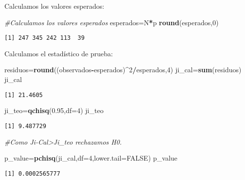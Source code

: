 \documentclass[a4paper,oneside,openany]{book}
\newenvironment{Shaded}{\begin{snugshade}}{\end{snugshade}}
\newcommand{\KeywordTok}[1]{\textcolor[rgb]{0.13,0.29,0.53}{\textbf{#1}}}
\newcommand{\DataTypeTok}[1]{\textcolor[rgb]{0.13,0.29,0.53}{#1}}
\newcommand{\DecValTok}[1]{\textcolor[rgb]{0.00,0.00,0.81}{#1}}
\newcommand{\FloatTok}[1]{\textcolor[rgb]{0.00,0.00,0.81}{#1}}
\newcommand{\CommentTok}[1]{\textcolor[rgb]{0.56,0.35,0.01}{\textit{#1}}}
\newcommand{\OtherTok}[1]{\textcolor[rgb]{0.56,0.35,0.01}{#1}}
\newcommand{\OperatorTok}[1]{\textcolor[rgb]{0.81,0.36,0.00}{\textbf{#1}}}
\newcommand{\NormalTok}[1]{#1}
\begin{document}
Calculamos los valores esperados:

\begin{Shaded}
\begin{Highlighting}[]
\CommentTok{#Calculamos los valores esperados}
\NormalTok{esperados=N}\OperatorTok{*}\NormalTok{p}
\KeywordTok{round}\NormalTok{(esperados,}\DecValTok{0}\NormalTok{)}
\end{Highlighting}
\end{Shaded}

\begin{verbatim}
[1] 247 345 242 113  39
\end{verbatim}

Calculamos el estadístico de prueba:

\begin{Shaded}
\begin{Highlighting}[]
\NormalTok{residuos=}\KeywordTok{round}\NormalTok{((observados}\OperatorTok{-}\NormalTok{esperados)}\OperatorTok{^}\DecValTok{2}\OperatorTok{/}\NormalTok{esperados,}\DecValTok{4}\NormalTok{)}
\NormalTok{ji_cal=}\KeywordTok{sum}\NormalTok{(residuos)}
\NormalTok{ji_cal}
\end{Highlighting}
\end{Shaded}

\begin{verbatim}
[1] 21.4605
\end{verbatim}

\begin{Shaded}
\begin{Highlighting}[]
\NormalTok{ji_teo=}\KeywordTok{qchisq}\NormalTok{(}\FloatTok{0.95}\NormalTok{,}\DataTypeTok{df=}\DecValTok{4}\NormalTok{)}
\NormalTok{ji_teo}
\end{Highlighting}
\end{Shaded}

\begin{verbatim}
[1] 9.487729
\end{verbatim}

\begin{Shaded}
\begin{Highlighting}[]
\CommentTok{#Como Ji-Cal>Ji_teo rechazamos H0.}

\NormalTok{p_value=}\KeywordTok{pchisq}\NormalTok{(ji_cal,}\DataTypeTok{df=}\DecValTok{4}\NormalTok{,}\DataTypeTok{lower.tail=}\OtherTok{FALSE}\NormalTok{)}
\NormalTok{p_value}
\end{Highlighting}
\end{Shaded}

\begin{verbatim}
[1] 0.0002565777
\end{verbatim}
\end{document}
